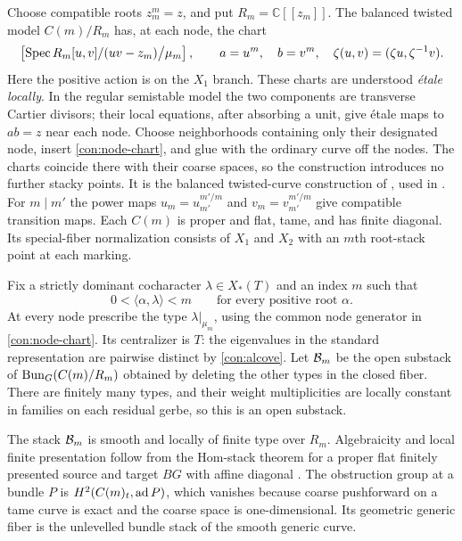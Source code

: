 Choose compatible roots $z_m^m=z$, and put $R_m=\mathbb C[[z_m]]$.
The balanced twisted model $C(m)/R_m$ has, at each node, the chart
\begin{equation}\label{con:node-chart}
 \left[\operatorname{Spec} R_m[u,v]/(uv-z_m)\big/\mu_m\right],
 \qquad a=u^m,\quad b=v^m,\quad
 \zeta(u,v)=(\zeta u,\zeta^{-1}v).
\end{equation}
Here the positive action is on the $X_1$ branch.  These charts are
understood \emph{\'etale locally}.  In the regular semistable model the
two components are transverse Cartier divisors; their local equations,
after absorbing a unit, give \'etale maps to $ab=z$ near each node.
Choose neighborhoods containing only their designated node, insert
\eqref{con:node-chart}, and glue with the ordinary curve off the
nodes.  The charts coincide there with their coarse spaces, so the
construction introduces no further stacky points.  It is the
balanced twisted-curve construction of
\cite[Theorems~1.9--1.10, Remark~1.11, and
Proposition~2.2(ii)]{OlssonTwisted}, used in \cite[Section~8.2]{CT}.
For $m\mid m'$ the power maps $u_m=u_{m'}^{m'/m}$ and
$v_m=v_{m'}^{m'/m}$ give compatible transition maps.  Each $C(m)$ is
proper and flat, tame, and has finite diagonal.  Its special-fiber
normalization consists of $X_1$ and $X_2$ with an $m$th root-stack
point at each marking.

Fix a strictly dominant cocharacter $\lambda\in X_*(T)$ and an index
$m$ such that
\begin{equation}\label{con:alcove}
 0<\langle\alpha,\lambda\rangle<m
 \qquad\text{for every positive root }\alpha.
\end{equation}
At every node prescribe the type $\lambda|_{\mu_m}$, using the common
node generator in \eqref{con:node-chart}.  Its centralizer is $T$:
the eigenvalues in the standard representation are pairwise distinct
by \eqref{con:alcove}.  Let $\mathcal B_m$ be the open substack of
$\operatorname{Bun}_G(C(m)/R_m)$ obtained by deleting the other types in the closed
fiber.  There are finitely many types, and their weight multiplicities
are locally constant in families on each residual gerbe, so this is
an open substack.

The stack $\mathcal B_m$ is smooth and locally of finite type over $R_m$.
Algebraicity and local finite presentation follow from the Hom-stack
theorem for a proper flat finitely presented source and target $BG$
with affine diagonal \cite[Theorem~1.2]{HallRydh}.  The obstruction
group at a bundle $P$ is $H^2(C(m)_t,\operatorname{ad} P)$, which vanishes because
coarse pushforward on a tame curve is exact and the coarse space is
one-dimensional.  Its geometric generic fiber is the unlevelled
bundle stack of the smooth generic curve.

